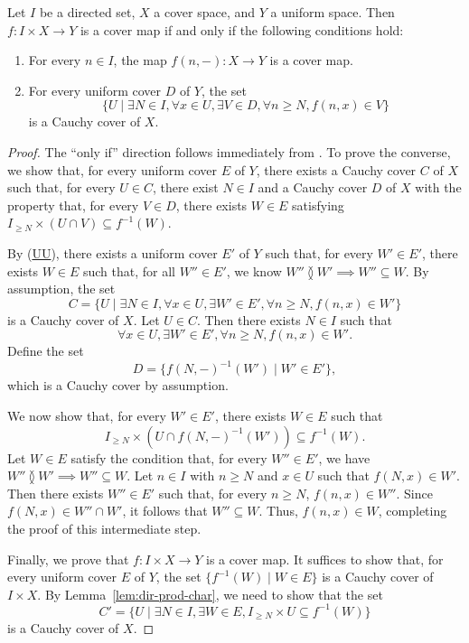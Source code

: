 \documentclass[reqno]{amsart}
\newcommand{\axref}[1]{(\hyperref[ax:#1]{#1})}
\theoremstyle{definition}
\theoremstyle{remark}
\numberwithin{figure}{section}
\newcommand{\overlap}[2]{#1 \between #2}
\begin{document}
\begin{prop}
Let $I$ be a directed set, $X$ a cover space, and $Y$ a uniform space.
Then $f : I \times X \to Y$ is a cover map if and only if the following conditions hold:
\begin{enumerate}
\item For every $n \in I$, the map $f(n, -) : X \to Y$ is a cover map.
\item For every uniform cover $D$ of $Y$, the set
        \[ \{ U \mid \exists N \in I, \forall x \in U, \exists V \in D, \forall n \geq N, f(n, x) \in V \} \]
        is a Cauchy cover of $X$.
\end{enumerate}
\end{prop}
\begin{proof}
The ``only if'' direction follows immediately from .
To prove the converse, we show that, for every uniform cover $E$ of $Y$, there exists a Cauchy cover $C$ of $X$ such that, for every $U \in C$,
there exist $N \in I$ and a Cauchy cover $D$ of $X$ with the property that, for every $V \in D$, there exists $W \in E$ satisfying
$I_{\geq N} \times (U \cap V) \subseteq f^{-1}(W)$.

By \axref{UU}, there exists a uniform cover $E'$ of $Y$ such that, for every $W' \in E'$, there exists $W \in E$ such that, for all $W'' \in E'$, we know $\overlap{W''}{W'} \implies W'' \subseteq W$.
By assumption, the set
\[ C = \{ U \mid \exists N \in I, \forall x \in U, \exists W' \in E', \forall n \geq N, f(n, x) \in W' \} \]
is a Cauchy cover of $X$.
Let $U \in C$.
Then there exists $N \in I$ such that
\[ \forall x \in U, \exists W' \in E', \forall n \geq N, f(n, x) \in W'. \]
Define the set
\[ D = \{ f(N, -)^{-1}(W') \mid W' \in E' \}, \]
which is a Cauchy cover by assumption.

We now show that, for every $W' \in E'$, there exists $W \in E$ such that
\[ I_{\geq N} \times (U \cap f(N, -)^{-1}(W')) \subseteq f^{-1}(W). \]
Let $W \in E$ satisfy the condition that, for every $W'' \in E'$, we have
$\overlap{W''}{W'} \implies W'' \subseteq W$.
Let $n \in I$ with $n \geq N$ and $x \in U$ such that $f(N, x) \in W'$. Then there exists $W'' \in E'$ such that, for every $n \geq N$, $f(n, x) \in W''$.
Since $f(N, x) \in W'' \cap W'$, it follows that $W'' \subseteq W$. Thus, $f(n, x) \in W$, completing the proof of this intermediate step.

Finally, we prove that $f : I \times X \to Y$ is a cover map.
It suffices to show that, for every uniform cover $E$ of $Y$, the set $\{ f^{-1}(W) \mid W \in E \}$ is a Cauchy cover of $I \times X$.
By Lemma~\ref{lem:dir-prod-char}, we need to show that the set
\[
C' = \{ U \mid \exists N \in I, \exists W \in E, I_{\geq N} \times U \subseteq f^{-1}(W) \}
\]
is a Cauchy cover of $X$.


\end{proof}
\end{document}
